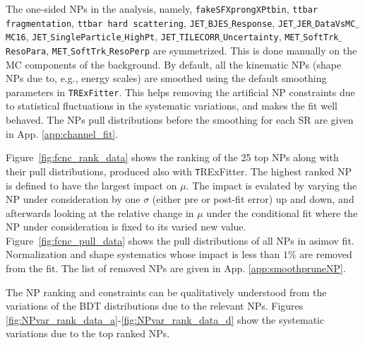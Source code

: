 The one-sided NPs in the analysis, namely, \texttt{fakeSFXprongXPtbin}, \texttt{ttbar fragmentation}, \texttt{ttbar hard scattering}, \texttt{JET$\_$BJES$\_$Response}, \texttt{JET$\_$JER$\_$DataVsMC$\_$MC16}, \texttt{JET$\_$SingleParticle$\_$HighPt}, \texttt{JET$\_$TILECORR$\_$Uncertainty}, \texttt{MET$\_$SoftTrk$\_$ResoPara}, \texttt{MET$\_$SoftTrk$\_$ResoPerp} are symmetrized. This is done manually on the MC components of the background. By default, all the kinematic NPs (shape NPs due to, e.g., energy scales) are smoothed using the default smoothing parameters in \texttt{TRExFitter}. This helps removing the artificial NP constraints due to statistical fluctuations in the systematic variations, and makes the fit well behaved. The NPs pull distributions before the smoothing for each SR are given in App. \ref{app:channel_fit}.

Figure~\ref{fig:fcnc_rank_data} shows the ranking of the 25 top NPs along with their pull distributions, produced also with {\texttt TRExFitter}. The highest ranked NP is defined to have the largest impact on $\mu$. The impact is evalated by varying the NP under consideration by one $\sigma$ (either pre or post-fit error) up and down, and afterwards looking at the relative change in $\mu$ under the conditional fit where the NP under consideration is fixed to its varied new value.
Figure~\ref{fig:fcnc_pull_data} shows the pull distributions of all NPs in asimov fit. %
Normalization and shape systematics whose impact is less than $1\%$ are removed from the fit. The list of removed NPs are given in App. \ref{app:smoothpruneNP}.

The NP ranking and constraints can be qualitatively understood from the variations of the BDT distributions due to the relevant NPs. Figures \ref{fig:NPvar_rank_data_a}-\ref{fig:NPvar_rank_data_d} show the systematic variations due to the top ranked NPs. %

